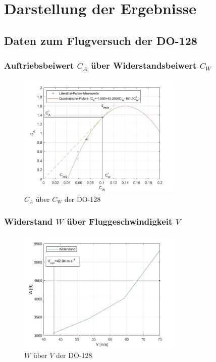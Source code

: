 \chapter{Darstellung der Ergebnisse}
\label{c:Ergebnisse}

\section{Daten zum Flugversuch der DO-128}

\subsection{Auftriebsbeiwert $C_A$ über Widerstandsbeiwert $C_{W}$}

\begin{figure}[H]
	\centering	\includegraphics[width=0.7\textwidth]{./Bilder/CA_CW_fertig.jpg}
	\caption{$C_{A}$ über $C_{W}$ der DO-128}
	\label{fig:CA_CW_DO128}
\end{figure}

\subsection{Widerstand $W$ über Fluggeschwindigkeit $V$}

\begin{figure}[H]
	\centering	\includegraphics[width=0.7\textwidth]{./Bilder/W_uber_V.jpg}
	\caption{$W$ über $V$ der DO-128}
	\label{fig:W_V_DO128}
\end{figure}

